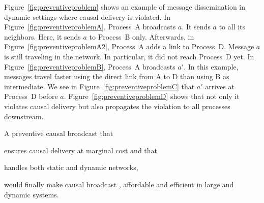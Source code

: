 Figure~\ref{fig:preventiveproblem} shows an example of message dissemination in
dynamic settings where causal delivery is violated. In
Figure~\ref{fig:preventiveproblemA}, Process~A broadcasts $a$. It sends $a$ to
all its neighbors. Here, it sends $a$ to Process~B only.  Afterwards, in
Figure~\ref{fig:preventiveproblemA2}, Process~A adds a link to
Process~D. Message $a$ is still traveling in the network. In particular, it did
not reach Process~D yet. In Figure~\ref{fig:preventiveproblemB}, Process~A
broadcasts $a'$. In this example, messages travel faster using the direct link
from A to D than using B as intermediate.  We see in
Figure~\ref{fig:preventiveproblemC} that $a'$ arrives at Process~D before
$a$. Figure~\ref{fig:preventiveproblemD} shows that not only it violates causal
delivery but also propagates the violation to all processes downstream.

A preventive causal broadcast that
\begin{inparaenum}[(i)]
\item ensures causal delivery at marginal cost and that
\item handles both static and dynamic networks,
\end{inparaenum}
would finally make causal broadcast , affordable and efficient in
large and dynamic systems.

%     


